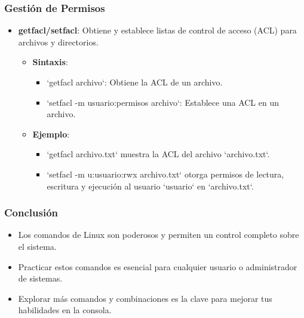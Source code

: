 \documentclass{beamer}
\begin{document}
\begin{frame}
\frametitle{Gestión de Permisos}
\begin{itemize}


    
    \item \textbf{getfacl/setfacl}: Obtiene y establece listas de control de acceso (ACL) para archivos y directorios.
    \begin{itemize}
        \item \textbf{Sintaxis}: 
        \begin{itemize}
            \item `getfacl archivo`: Obtiene la ACL de un archivo.
            \item `setfacl -m usuario:permisos archivo`: Establece una ACL en un archivo.
        \end{itemize}
        \item \textbf{Ejemplo}: 
        \begin{itemize}
            \item `getfacl archivo.txt` muestra la ACL del archivo `archivo.txt`.
            \item `setfacl -m u:usuario:rwx archivo.txt` otorga permisos de lectura, escritura y ejecución al usuario `usuario` en `archivo.txt`.
        \end{itemize}
    \end{itemize}
\end{itemize}
\end{frame}

\begin{frame}
\frametitle{Conclusión}
\begin{itemize}
    \item Los comandos de Linux son poderosos y permiten un control completo sobre el sistema.
    \item Practicar estos comandos es esencial para cualquier usuario o administrador de sistemas.
    \item Explorar más comandos y combinaciones es la clave para mejorar tus habilidades en la consola.
\end{itemize}
\end{frame}
\end{document}
